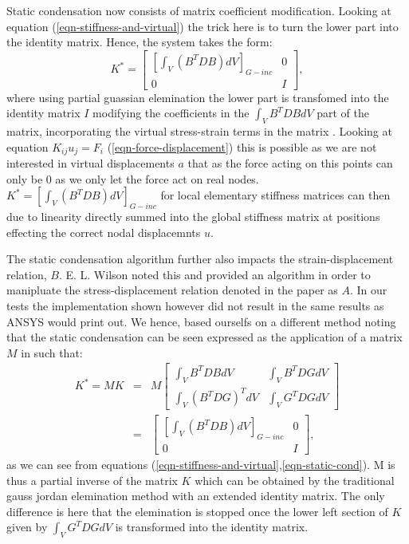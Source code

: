 Static condensation now consists of matrix coefficient
modification. Looking at equation (\ref{eqn-stiffness-and-virtual})
the trick here is to turn the lower part into the identity
matrix. Hence, the system takes the form:
\begin{equation}
  K^* = \left[\begin{array}{cc}
      \left[\int_V(B^{T}D B)dV\right]_{G-inc} & 0 \\
      0 & I
    \end{array}\right],
  \label{eqn-static-cond}
\end{equation}
where using partial guassian elemination the lower part is transfomed
into the identity matrix $I$ modifying the coefficients in the
$\int_VB^{T}DB dV$ part of the matrix, incorporating the virtual stress-strain
terms in the matrix \cite{static-cond}. Looking at equation $K_{ij} u_j = F_i$
(\ref{eqn-force-displacement}) this is possible as we are not
interested in virtual displacements $a$ that as the force acting on
this points can only be $0$ as we only let the force act on real
nodes. $K^* = \left[\int_V(B^{T}D B)dV\right]_{G-inc}$ for local
elementary stiffness matrices can then due to linearity directly
summed into the global stiffness matrix at positions effecting the
correct nodal displacemnts $u$.

The static condensation algorithm further also impacts the strain-displacement
relation, $B$. E. L. Wilson noted this \cite{static-cond} and provided
an algorithm in order to manipluate the stress-displacement relation
denoted in the paper as $A$. In our tests the implementation shown
however did not result in the same results as ANSYS would print
out. We hence, based ourselfs on a different method noting that the
static condensation can be seen expressed as the application of a
matrix $M$ in such that: 
\begin{eqnarray}
  K^* = MK &=& M \left[\begin{array}{cc}
      \int_V B^{T}DB dV & \int_V B^{T}DG dV \\
      \int_V(B^{T}DG)^{T} dV & \int_VG^{T}DG dV
    \end{array}\right] \nonumber \\ 
     &=& \left[\begin{array}{cc}
      \left[\int_V(B^{T}D B)dV\right]_{G-inc} & 0 \\
      0 & I
    \end{array}\right] , \label{eqn-partial-inverse}
\end{eqnarray}
as we can see from equations
(\ref{eqn-stiffness-and-virtual},\ref{eqn-static-cond}). M is thus a
partial inverse of the matrix $K$ which can be obtained by
the traditional gauss jordan elemination method with an extended 
identity matrix. The only difference is here that the elemination is
stopped once the lower left section of $K$ given by $\int_VG^{T}DG dV$
is transformed into the identity matrix.

